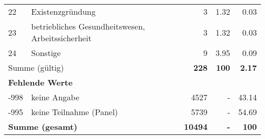 \begin{longtable}{lXrrr}
        22 & \multicolumn{1}{X}{Existenzgründung} & %
          \num{3} &
          \num[round-mode=places,round-precision=2]{1.32} &
          \num[round-mode=places,round-precision=2]{0.03} \\

        23 & \multicolumn{1}{X}{betriebliches Gesundheitswesen, Arbeitssicherheit} & %
          \num{3} &
          \num[round-mode=places,round-precision=2]{1.32} &
          \num[round-mode=places,round-precision=2]{0.03} \\

        24 & \multicolumn{1}{X}{Sonstige} & %
          \num{9} &
          \num[round-mode=places,round-precision=2]{3.95} &
          \num[round-mode=places,round-precision=2]{0.09} \\

     \midrule
     \multicolumn{2}{l}{Summe (gültig)} &
       \textbf{\num{228}} &
     \textbf{\num{100}} &
       \textbf{\num[round-mode=places,round-precision=2]{2.17}} \\
     \multicolumn{5}{l}{\textbf{Fehlende Werte}}\\
       -998 &
       keine Angabe &
         \num{4527} &
        - &
         \num[round-mode=places,round-precision=2]{43.14} \\
       -995 &
       keine Teilnahme (Panel) &
         \num{5739} &
        - &
         \num[round-mode=places,round-precision=2]{54.69} \\
     \midrule
     \multicolumn{2}{l}{\textbf{Summe (gesamt)}} &
          \textbf{\num{10494}} &
        \textbf{-} &
        \textbf{\num{100}} \\
     \bottomrule
     \end{longtable}
     
